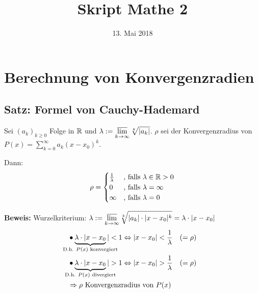 \documentclass[10pt, a4paper, fleqn]{article}
\begin{document}
    \title{Skript Mathe 2}
    \date{13. Mai 2018}
    \maketitle
\fi
    \section*{Berechnung von Konvergenzradien}
    \subsection{Satz: Formel von Cauchy-Hademard}
    
    Sei $(a_k)_{k \geq 0}$ Folge in $\mathbb{R}$ und $\displaystyle\lambda := \varlimsup_{k \to \infty} \sqrt[k]{|a_k|}$.
    $\rho$ sei der Konvergenzradius von $P(x) = \sum\limits_{k=0}^\infty a_k (x-x_0)^k$.
    
    Dann:
    $$
        \rho = \begin{cases}
            \frac{1}{\lambda} &\text{, falls } \lambda \in \mathbb{R} > 0 \\
            0 &\text{, falls } \lambda = \infty \\
            \infty &\text{, falls } \lambda = 0
        \end{cases}
    $$

    \textbf{Beweis: }
    Wurzelkriterium: $\displaystyle\lambda := \varlimsup_{k \to \infty} \sqrt[k]{|a_k| \cdot |x-x_0|^k} = \lambda \cdot |x-x_0|$
    \[\begin{aligned}
        &\bullet \underbrace{\lambda \cdot |x-x_0}_{\mathclap{\text{D.h. } P(x) \text{ konvergiert}}} | < 1 \eqv |x-x_0| < \frac{1}{\lambda} \quad (= \rho) \\
        &\bullet \underbrace{\lambda \cdot |x-x_0}_{\mathclap{\text{D.h. } P(x) \text{ divergiert}}} | > 1 \eqv |x-x_0| > \frac{1}{\lambda} \quad (= \rho) \\
        &\imp \rho \text{ Konvergenzradius von } P(x)
    \end{aligned}\]
\end{document}

